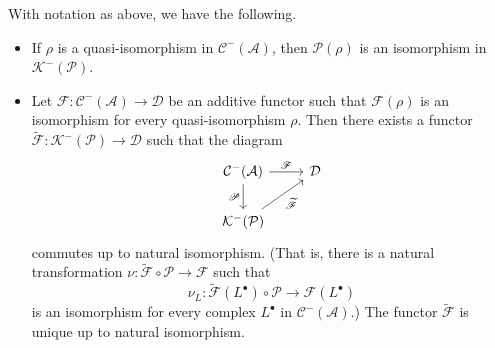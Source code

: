 \begin{theorem}
With notation as above, we have the following.
\begin{itemize}
\item If $\rho$ is a quasi-isomorphism in $\mathcal{C}^-(\mathcal{A})$, then $\mathscr{P}(\rho)$ is an isomorphism in $\mathcal{K}^-(\mathcal{P})$.
\item Let $\mathscr{F}:\mathcal{C}^-(\mathcal{A})\to\mathcal{D}$ be an additive functor such that $\mathscr{F}(\rho)$ is an isomorphism for every quasi-isomorphism $\rho$. Then there exists a functor $\widetilde{\mathscr{F}}:\mathcal{K}^-(\mathcal{P})\to\mathcal{D}$ such that the diagram
\[\begin{tikzcd}
\mathcal{C}^-(\mathcal{A})\ar[r,"\mathscr{F}"]\ar[d,swap,"\mathscr{P}"]&\mathcal{D}\\
\mathcal{K}^-(\mathcal{P})\ar[ru,swap,"\widetilde{\mathscr{F}}"]&
\end{tikzcd}\]
commutes up to natural isomorphism. (That is, there is a natural transformation $\nu:\widetilde{\mathscr{F}}\circ\mathscr{P}\to\mathscr{F}$ such that
\[\nu_L:\widetilde{\mathscr{F}}(L^\bullet)\circ\mathscr{P}\to\mathscr{F}(L^\bullet)\]
is an isomorphism for every complex $L^\bullet$ in $\mathcal{C}^-(\mathcal{A})$.) The functor $\widetilde{\mathscr{F}}$ is unique up to natural isomorphism.
\end{itemize}
\end{theorem}
